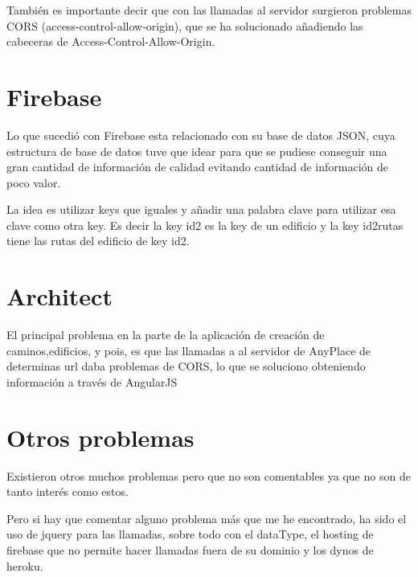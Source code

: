 También es importante decir que con las llamadas al servidor surgieron problemas CORS (access-control-allow-origin),
que se ha solucionado añadiendo las cabeceras de Access-Control-Allow-Origin. 

\section{Firebase}\label{Firebase}

Lo que sucedió con Firebase esta relacionado con su base de datos JSON, cuya estructura de base de datos tuve que idear para que se pudiese conseguir una gran cantidad de información de calidad evitando cantidad de información de poco valor.

La idea es utilizar keys que iguales y añadir una palabra clave para utilizar esa clave como otra key. Es decir la key id2 es la key de un edificio y la key id2rutas tiene las rutas del edificio de key id2.


\section{Architect}\label{Architect} 

El principal problema en la parte de la aplicación de creación de caminos,edificios, y pois, es que las llamadas a al servidor de AnyPlace de determinas url daba problemas de CORS, lo que se soluciono obteniendo información a través de AngularJS 


\section{Otros problemas}\label{otros}

Existieron otros muchos problemas pero que no son comentables ya que no son de tanto interés como estos.

Pero si hay que comentar alguno problema más que me he encontrado, ha sido el uso de jquery para las llamadas, sobre todo con el dataType, el hosting de firebase que no permite hacer llamadas fuera de su dominio y los dynos de heroku.
